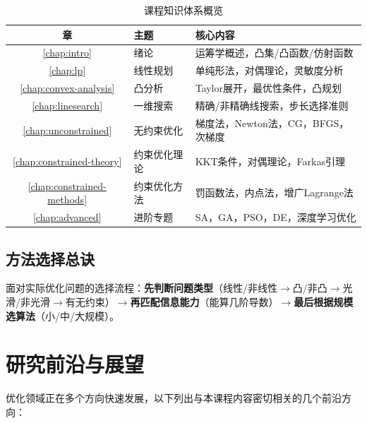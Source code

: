 \begin{table}[H]
\centering
\small
\caption{课程知识体系概览}
\begin{tabular}{@{}cl>{\raggedright\arraybackslash}p{6cm}@{}}
\toprule
\textbf{章} & \textbf{主题} & \textbf{核心内容} \\
\midrule
\ref{chap:intro} & 绪论 & 运筹学概述，凸集/凸函数/仿射函数 \\
\ref{chap:lp} & 线性规划 & 单纯形法，对偶理论，灵敏度分析 \\
\ref{chap:convex-analysis} & 凸分析 & Taylor展开，最优性条件，凸规划 \\
\ref{chap:linesearch} & 一维搜索 & 精确/非精确线搜索，步长选择准则 \\
\ref{chap:unconstrained} & 无约束优化 & 梯度法，Newton法，CG，BFGS，次梯度 \\
\ref{chap:constrained-theory} & 约束优化理论 & KKT条件，对偶理论，Farkas引理 \\
\ref{chap:constrained-methods} & 约束优化方法 & 罚函数法，内点法，增广Lagrange法 \\
\ref{chap:advanced} & 进阶专题 & SA，GA，PSO，DE，深度学习优化 \\
\bottomrule
\end{tabular}
\end{table}

\subsection{方法选择总诀}

面对实际优化问题的选择流程：\textbf{先判断问题类型}（线性/非线性$\rightarrow$凸/非凸$\rightarrow$光滑/非光滑$\rightarrow$有无约束）$\rightarrow$\textbf{再匹配信息能力}（能算几阶导数）$\rightarrow$\textbf{最后根据规模选算法}（小/中/大规模）。

\section{研究前沿与展望}

优化领域正在多个方向快速发展，以下列出与本课程内容密切相关的几个前沿方向：

